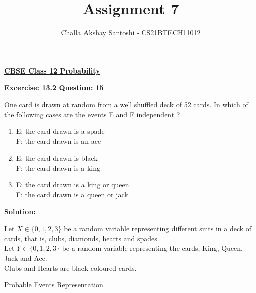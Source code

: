 \documentclass[journal,12pt,twocolumn]{IEEEtran}
\begin{document}
\newcommand{\myvec}[1]{\ensuremath{\begin{pmatrix}#1\end{pmatrix}}}
\newcommand{\mydet}[1]{\ensuremath{\begin{vmatrix}#1\end{vmatrix}}}
\makeatletter
{}
\makeatother
\let\StandardTheFigure\thefigure
\let\vec\mathbf
\renewcommand{\thefigure}{\theproblem}
\def\putbox#1#2#3{\makebox[0in][l]{\makebox[#1][l]{}\raisebox{\baselineskip}[0in][0in]{\raisebox{#2}[0in][0in]{#3}}}}
     \def\rightbox#1{\makebox[0in][r]{#1}}
     \def\centbox#1{\makebox[0in]{#1}}
     \def\topbox#1{\raisebox{-\baselineskip}[0in][0in]{#1}}
     \def\midbox#1{\raisebox{-0.5\baselineskip}[0in][0in]{#1}}
\vspace{3cm}
\title{Assignment 7}
\author{Challa Akshay Santoshi - CS21BTECH11012}
\maketitle
\newpage
\bigskip
\renewcommand{\thefigure}{\theenumi}
\renewcommand{\thetable}{\theenumi}
\begin{center}
  \textbf{\underline{CBSE Class 12 Probability}}\\
\end{center}
\begin{center}
  \textbf{Excercise: 13.2 Question: 15}  
\end{center}
One card is drawn at random from a well shuffled deck of 52 cards. In which of the following cases are the events E and F independent ?
\begin{enumerate}
	\item E: the card drawn is a spade\\
	F: the card drawn is an ace
	\item E: the card drawn is black\\
	F: the card drawn is a king
	\item E: the card drawn is a king or queen\\
	F: the card drawn is a queen or jack
\end{enumerate}
\begin{center}
  \textbf{Solution:}  
\end{center}

Let $X \in \{0,1,2,3\} $ be a random variable representing different suits in a deck of cards, that is, clubs, diamonds, hearts and spades.\\
Let $Y \in \{0,1,2,3\} $ be a random variable representing the cards, King, Queen, Jack and Ace.\\
Clubs and Hearts are black coloured cards.
\begin{table}[ht!]

\caption{Probable Events Representation}
\label{tables:table1}
\end{table}
\end{document}
